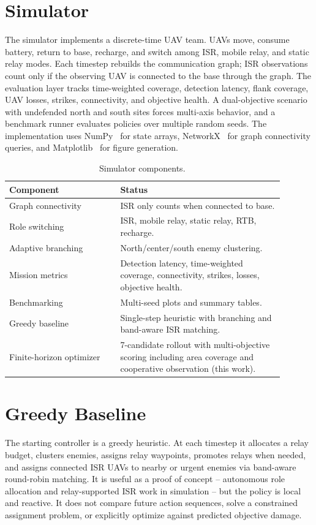 \documentclass[conference]{IEEEtran}
\begin{document}
\section{Simulator}
The simulator implements a discrete-time UAV team. UAVs move, consume battery,
return to base, recharge, and switch among ISR, mobile relay, and static relay
modes. Each timestep rebuilds the communication graph; ISR observations count
only if the observing UAV is connected to the base through the graph. The
evaluation layer tracks time-weighted coverage, detection latency, flank
coverage, UAV losses, strikes, connectivity, and objective health. A
dual-objective scenario with undefended north and south sites forces multi-axis
behavior, and a benchmark runner evaluates policies over multiple random seeds.
The implementation uses NumPy~\cite{harris_numpy_2020} for state arrays,
NetworkX~\cite{hagberg_networkx_2008} for graph connectivity queries, and
Matplotlib~\cite{hunter_matplotlib_2007} for figure generation.

\begin{table}[t]
\centering
\caption{Simulator components.}
\label{tab:status}
\begin{tabular}{p{0.36\linewidth}p{0.53\linewidth}}
\toprule
Component & Status \\
\midrule
Graph connectivity & ISR only counts when connected to base. \\
Role switching & ISR, mobile relay, static relay, RTB, recharge. \\
Adaptive branching & North/center/south enemy clustering. \\
Mission metrics & Detection latency, time-weighted coverage, connectivity, strikes, losses, objective health. \\
Benchmarking & Multi-seed plots and summary tables. \\
Greedy baseline & Single-step heuristic with branching and band-aware ISR matching. \\
Finite-horizon optimizer & 7-candidate rollout with multi-objective scoring including area coverage and cooperative observation (this work). \\
\bottomrule
\end{tabular}
\end{table}

\section{Greedy Baseline}
The starting controller is a greedy heuristic. At each timestep it allocates a
relay budget, clusters enemies, assigns relay waypoints, promotes relays when
needed, and assigns connected ISR UAVs to nearby or urgent enemies via
band-aware round-robin matching. It is useful as a proof of concept --
autonomous role allocation and relay-supported ISR work in simulation -- but
the policy is local and reactive. It does not compare future action sequences,
solve a constrained assignment problem, or explicitly optimize against
predicted objective damage.
\end{document}

